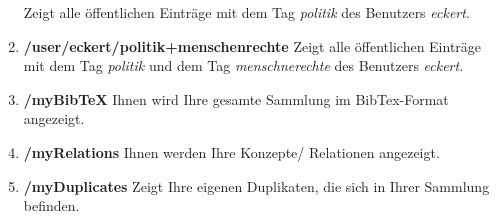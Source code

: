 \documentclass[b5paper,11pt,twoside]{scrbook} %
\begin{document}
\begin{enumerate}
    Zeigt alle öffentlichen Einträge mit dem Tag \textit{politik} des Benutzers \textit{eckert}.
    \item \textbf{/user/eckert/politik+menschenrechte} \newline
    Zeigt alle öffentlichen Einträge mit dem Tag \textit{politik} und dem Tag \textit{menschnerechte} des Benutzers \textit{eckert}.
     \item \textbf{/myBibTeX} \newline
    Ihnen wird Ihre gesamte Sammlung im BibTex-Format angezeigt.
    \item \textbf{/myRelations} \newline
    Ihnen werden Ihre Konzepte/ Relationen angezeigt.
    \item \textbf{/myDuplicates} \newline
    Zeigt Ihre eigenen Duplikaten, die sich in Ihrer Sammlung befinden.
\end{enumerate}
    
\end{document}
